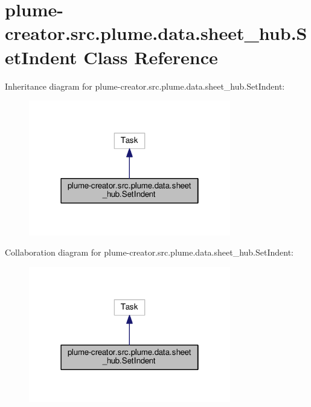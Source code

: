 \hypertarget{classplume-creator_1_1src_1_1plume_1_1data_1_1sheet__hub_1_1_set_indent}{}\section{plume-\/creator.src.\+plume.\+data.\+sheet\+\_\+hub.\+Set\+Indent Class Reference}
\label{classplume-creator_1_1src_1_1plume_1_1data_1_1sheet__hub_1_1_set_indent}


Inheritance diagram for plume-\/creator.src.\+plume.\+data.\+sheet\+\_\+hub.\+Set\+Indent\+:\nopagebreak
\begin{figure}[H]
\begin{center}
\leavevmode
\includegraphics[width=250pt]{classplume-creator_1_1src_1_1plume_1_1data_1_1sheet__hub_1_1_set_indent__inherit__graph}
\end{center}
\end{figure}


Collaboration diagram for plume-\/creator.src.\+plume.\+data.\+sheet\+\_\+hub.\+Set\+Indent\+:\nopagebreak
\begin{figure}[H]
\begin{center}
\leavevmode
\includegraphics[width=250pt]{classplume-creator_1_1src_1_1plume_1_1data_1_1sheet__hub_1_1_set_indent__coll__graph}
\end{center}
\end{figure}

